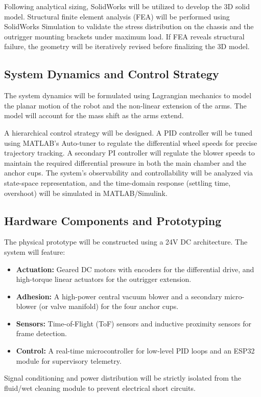 \documentclass[12pt, a4paper]{article}
\begin{document}
Following analytical sizing, SolidWorks will be utilized to develop the 3D solid model. Structural finite element analysis (FEA) will be performed using SolidWorks Simulation to validate the stress distribution on the chassis and the outrigger mounting brackets under maximum load. If FEA reveals structural failure, the geometry will be iteratively revised before finalizing the 3D model.

\subsection{System Dynamics and Control Strategy}
The system dynamics will be formulated using Lagrangian mechanics to model the planar motion of the robot and the non-linear extension of the arms. The model will account for the mass shift as the arms extend. 

A hierarchical control strategy will be designed. A PID controller will be tuned using MATLAB's Auto-tuner to regulate the differential wheel speeds for precise trajectory tracking. A secondary PI controller will regulate the blower speeds to maintain the required differential pressure in both the main chamber and the anchor cups. The system's observability and controllability will be analyzed via state-space representation, and the time-domain response (settling time, overshoot) will be simulated in MATLAB/Simulink.

\subsection{Hardware Components and Prototyping}
The physical prototype will be constructed using a 24V DC architecture. The system will feature:
\begin{itemize}
    \item \textbf{Actuation:} Geared DC motors with encoders for the differential drive, and high-torque linear actuators for the outrigger extension.
    \item \textbf{Adhesion:} A high-power central vacuum blower and a secondary micro-blower (or valve manifold) for the four anchor cups.
    \item \textbf{Sensors:} Time-of-Flight (ToF) sensors and inductive proximity sensors for frame detection.
    \item \textbf{Control:} A real-time microcontroller for low-level PID loops and an ESP32 module for supervisory telemetry.
\end{itemize}
Signal conditioning and power distribution will be strictly isolated from the fluid/wet cleaning module to prevent electrical short circuits.
\end{document}
